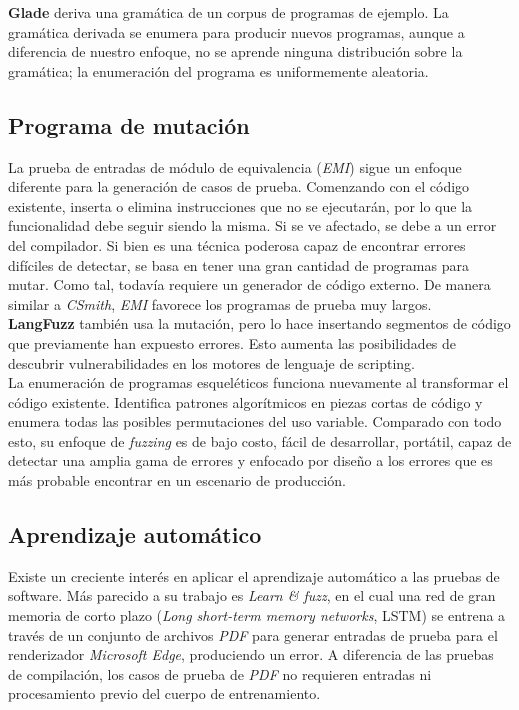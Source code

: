 \textbf{Glade}\cite{Glade:Bastani:Sharma:Aiken:Liang} deriva una gramática de un corpus de programas de ejemplo. La gramática derivada se enumera para producir nuevos programas, aunque a diferencia de nuestro enfoque, no se aprende ninguna distribución sobre la gramática; la enumeración del programa es uniformemente aleatoria.

\subsection{Programa de mutación}
La prueba de entradas de módulo de equivalencia (\textit{EMI})\cite{Le:Afshari:Su:Modulo}\cite{Sun:Le:Su:Mutation} sigue un enfoque diferente para la generación de casos de prueba. Comenzando con el código existente, inserta o elimina instrucciones que no se ejecutarán, por lo que la funcionalidad debe seguir siendo la misma. Si se ve afectado, se debe a un error del compilador. Si bien es una técnica poderosa capaz de encontrar errores difíciles de detectar, se basa en tener una gran cantidad de programas para mutar. Como tal, todavía requiere un generador de código externo. De manera similar a \textit{CSmith}, \textit{EMI} favorece los programas de prueba muy largos.\\

\textbf{LangFuzz}\cite{Holler:Herzig:Zeller:Fragments} también usa la mutación, pero lo hace insertando segmentos de código que previamente han expuesto errores. Esto aumenta las posibilidades de descubrir vulnerabilidades en los motores de lenguaje de scripting.\\

La enumeración de programas esqueléticos\cite{Zhang:Sun:Su:Skeletal} funciona nuevamente al transformar el código existente. Identifica patrones algorítmicos en piezas cortas de código y enumera todas las posibles permutaciones del uso variable. Comparado con todo esto, su enfoque de \textit{fuzzing} es de bajo costo, fácil de desarrollar, portátil, capaz de detectar una amplia gama de errores y enfocado por diseño a los errores que es más probable encontrar en un escenario de producción.

\subsection{Aprendizaje automático}
Existe un creciente interés en aplicar el aprendizaje automático a las pruebas de software. Más parecido a su trabajo es \textit{Learn \& fuzz}\cite{Godefroid:Peleg:Singh:LearnAndFuzz}, en el cual una red de gran memoria de corto plazo (\textit{Long short-term memory networks}, LSTM) se entrena a través de un conjunto de archivos \textit{PDF} para generar entradas de prueba para el renderizador \textit{Microsoft Edge}, produciendo un error. A diferencia de las pruebas de compilación, los casos de prueba de \textit{PDF} no requieren entradas ni procesamiento previo del cuerpo de entrenamiento.\\

